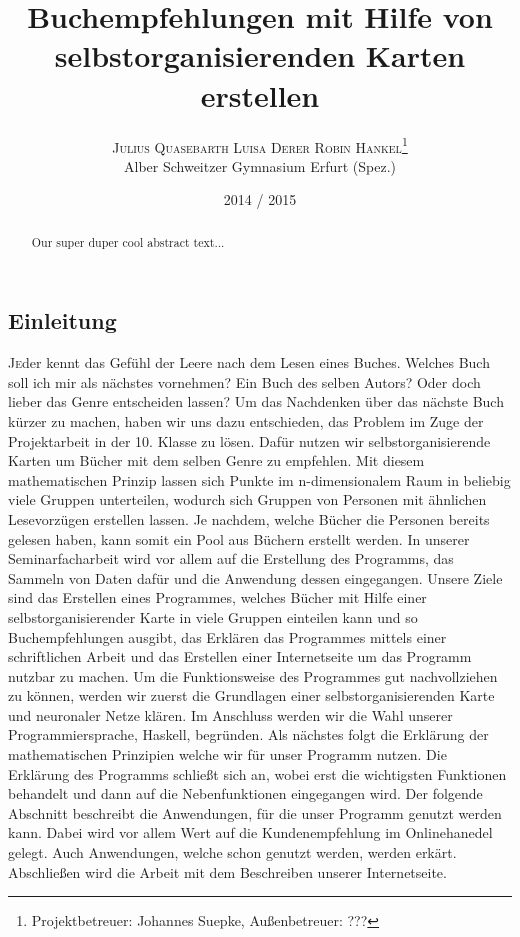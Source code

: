 \documentclass[twoside,a4paper,draft]{article}
\title{\vspace{-15mm}\fontsize{24pt}{10pt}\selectfont\bfseries{}Buchempfehlungen mit Hilfe von selbstorganisierenden Karten erstellen}
\author{\large\textsc{Julius Quasebarth \quad Luisa Derer \quad Robin Hankel}\thanks{Projektbetreuer: Johannes Suepke, Außenbetreuer: ???}\\[2mm]\normalsize Alber Schweitzer Gymnasium Erfurt (Spez.)\\\vspace{-5mm}}
\date{2014 / 2015}
\newcommand{\commonlettrine}[1]{\lettrine[nindent=0em,lines=2]{#1}}
\begin{document}
\maketitle

\thispagestyle{fancy}


\begin{otherlanguage}{english}
\begin{abstract}
\noindent
Our super duper cool abstract text...
\end{abstract}
\end{otherlanguage}

\tableofcontents

\begin{multicols}{2}

\section{Einleitung}

\commonlettrine{J}eder kennt das Gefühl der Leere nach dem Lesen eines Buches. Welches Buch soll ich mir als nächstes vornehmen? Ein Buch des selben Autors? Oder doch lieber das Genre entscheiden lassen?
Um das Nachdenken über das nächste Buch kürzer zu machen, haben wir uns dazu entschieden, das Problem im Zuge der Projektarbeit in der 10. Klasse zu lösen.
Dafür nutzen wir selbstorganisierende Karten um Bücher mit dem selben Genre zu empfehlen. Mit diesem mathematischen Prinzip lassen sich Punkte im n-dimensionalem Raum in beliebig viele Gruppen unterteilen, wodurch sich Gruppen von Personen mit ähnlichen Lesevorzügen erstellen lassen. Je nachdem, welche Bücher die Personen bereits gelesen haben, kann somit ein \glqq{}Pool\grqq{} aus Büchern erstellt werden. In unserer Seminarfacharbeit wird vor allem auf die Erstellung des Programms, das Sammeln von Daten dafür und die Anwendung dessen eingegangen. 
Unsere Ziele sind das Erstellen eines Programmes, welches Bücher mit Hilfe einer selbstorganisierender Karte in viele Gruppen einteilen kann und so Buchempfehlungen ausgibt, das Erklären das Programmes mittels einer schriftlichen Arbeit und das Erstellen einer Internetseite um das Programm nutzbar zu machen.
Um die Funktionsweise des Programmes gut nachvollziehen zu können, werden wir zuerst die Grundlagen einer selbstorganisierenden Karte und neuronaler Netze klären. Im Anschluss werden wir die Wahl unserer Programmiersprache, Haskell, begründen. Als nächstes folgt die Erklärung der mathematischen Prinzipien welche wir für unser Programm nutzen. Die Erklärung des Programms schließt sich an, wobei erst die wichtigsten Funktionen behandelt und dann auf die Nebenfunktionen eingegangen wird. Der folgende Abschnitt beschreibt die Anwendungen, für die unser Programm genutzt werden kann. Dabei wird vor allem Wert auf die Kundenempfehlung im Onlinehanedel gelegt. Auch Anwendungen, welche schon genutzt werden, werden erkärt. Abschließen wird die Arbeit mit dem Beschreiben unserer Internetseite.


\end{multicols}
\end{document}
